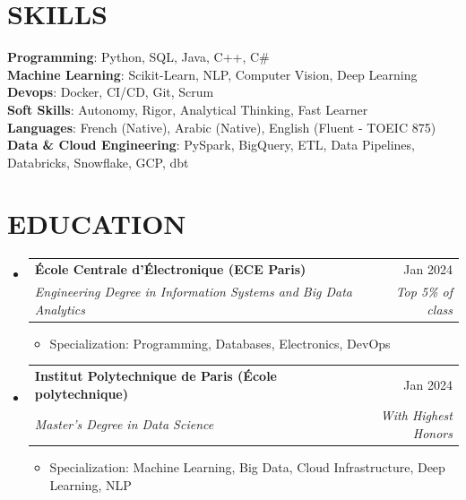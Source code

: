 \documentclass[11pt,a4paper]{article}
\makeatletter
\newcommand{\resumeItem}[1]{
  \item\footnotesize{
    {#1 \vspace{-1pt}}
  }
}
\newcommand{\resumeSubheading}[4]{
  \vspace{2pt}\item
    \begin{tabular*}{\textwidth}[t]{l@{\extracolsep{\fill}}r}
      {\footnotesize\textbf{#1}} & {\footnotesize#2} \\
      {\footnotesize\textit{#3}} & {\footnotesize\textit{#4}} \\
    \end{tabular*}\vspace{2pt}
}
\newcommand{\resumeSubHeadingListStart}{\begin{itemize}[leftmargin=0in, label={}]}
\newcommand{\resumeSubHeadingListEnd}{\end{itemize}}
\newcommand{\resumeItemListStart}{\begin{itemize}[label={\textbullet}]}
\newcommand{\resumeItemListEnd}{\end{itemize}\vspace{0pt}}
\makeatother
\begin{document}
\section{SKILLS}
\begin{itemize}[leftmargin=0in, label={}]
\footnotesize{\item{
{\footnotesize\textbf{Programming}:} {\footnotesize Python, SQL, Java, C++, C{\#}} \\
\vspace{3pt}
{\footnotesize\textbf{Machine Learning}:} {\footnotesize Scikit-Learn, NLP, Computer Vision, Deep Learning} \\
\vspace{3pt}
{\footnotesize\textbf{Devops}:} {\footnotesize Docker, CI/CD, Git, Scrum} \\
\vspace{3pt}
{\footnotesize\textbf{Soft Skills}:} {\footnotesize Autonomy, Rigor, Analytical Thinking, Fast Learner} \\
\vspace{3pt}
{\footnotesize\textbf{Languages}:} {\footnotesize French (Native), Arabic (Native), English (Fluent - TOEIC 875)} \\
\vspace{3pt}
{\footnotesize\textbf{Data \& Cloud Engineering}:} {\footnotesize PySpark, BigQuery, ETL, Data Pipelines, Databricks, Snowflake, GCP, dbt}
}
}
\end{itemize}

\section{EDUCATION}
\resumeSubHeadingListStart
    \resumeSubheading
      {École Centrale d'Électronique (ECE Paris)}
      {Jan 2024}
      {Engineering Degree in Information Systems and Big Data Analytics}
      {Top 5\% of class}
      \resumeItemListStart
        \resumeItem{Specialization: Programming, Databases, Electronics, DevOps}
      \resumeItemListEnd
    \resumeSubheading
      {Institut Polytechnique de Paris (École polytechnique)}
      {Jan 2024}
      {Master's Degree in Data Science}
      {With Highest Honors}
      \resumeItemListStart
        \resumeItem{Specialization: Machine Learning, Big Data, Cloud Infrastructure, Deep Learning, NLP}
      \resumeItemListEnd
  \resumeSubHeadingListEnd
\end{document}
